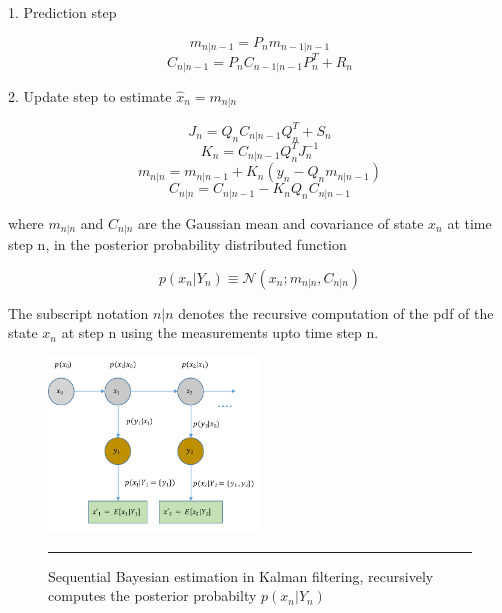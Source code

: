         1. Prediction step

        \begin{equation} m_{n|n-1} = P_{n}m_{n-1|n-1} \end{equation}
        \begin{equation} C_{n|n-1} = P_{n}C_{n-1|n-1}P^{T}_{n} + R_{n} \end{equation}

        2. Update step to estimate $\hat{x}_{n} = m_{n|n}$

        \begin{equation} J_{n} = Q_{n}C_{n|n-1}Q^{T}_{n} + S_{n} \end{equation}
        \begin{equation} K_{n} = C_{n|n-1}Q^{T}_{n}J^{-1}_{n} \end{equation}
        \begin{equation} m_{n|n} = m_{n|n-1} + K_{n}(y_{n} - Q_{n}m_{n|n-1}) \end{equation}
        \begin{equation} C_{n|n} = C_{n|n-1} - K_{n}Q_{n}C_{n|n-1} \end{equation}

where $m_{n|n}$ and $C_{n|n}$ are the Gaussian mean and covariance of state $x_{n}$ at time step n,
in the posterior probability distributed function

        \begin{equation} p(x_{n}|Y_{n}) \equiv \mathcal{N}(x_{n};m_{n|n},C_{n|n}) \end{equation}

The subscript notation $n|n$ denotes the recursive computation of the pdf of the state $x_{n}$ at
step n using the measurements upto time step n.

\begin{figure}[htbp]
  \centering
    \includegraphics[width=0.5\textwidth,height=0.5\textheight,keepaspectratio]{Figures/kalman-filter.pdf}
    \rule{35em}{0.5pt}
  \caption[Sequential Bayesian estimation in Kalman filtering]{Sequential Bayesian estimation in
  Kalman filtering, recursively computes the posterior probabilty $p(x_{n}|Y_{n})$}
  \label{fig:kalman-filter}
\end{figure}

